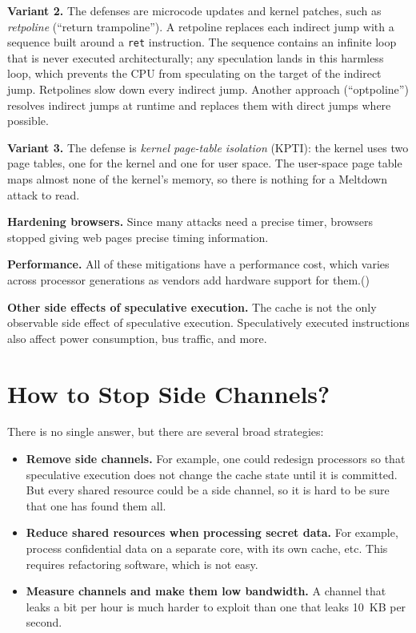 \documentclass[
  letterpaper,
]{scrbook}
\newcounter{none} %
\theoremstyle{definition}
\theoremstyle{plain}
\theoremstyle{plain}
\theoremstyle{remark}
\begin{document}
\textbf{Variant 2.} The defenses are microcode updates and kernel
patches, such as \emph{retpoline} (``return trampoline''). A retpoline
replaces each indirect jump with a sequence built around a \texttt{ret}
instruction. The sequence contains an infinite loop that is never
executed architecturally; any speculation lands in this harmless loop,
which prevents the CPU from speculating on the target of the indirect
jump. Retpolines slow down every indirect jump. Another approach
(``optpoline'') resolves indirect jumps at runtime and replaces them
with direct jumps where possible.

\textbf{Variant 3.} The defense is \emph{kernel page-table isolation}
(KPTI): the kernel uses two page tables, one for the kernel and one for
user space. The user-space page table maps almost none of the kernel's
memory, so there is nothing for a Meltdown attack to read.
{}

\textbf{Hardening browsers.} Since many attacks need a precise timer,
browsers stopped giving web pages precise timing information.

\textbf{Performance.} All of these mitigations have a performance cost,
which varies across processor generations as vendors add hardware
support for them.()

\textbf{Other side effects of speculative execution.} The cache is not
the only observable side effect of speculative execution. Speculatively
executed instructions also affect power consumption, bus traffic, and
more.

\chapter{How to Stop Side Channels?}\label{how-to-stop-side-channels}

There is no single answer, but there are several broad strategies:

\begin{itemize}
\item
  \textbf{Remove side channels.} For example, one could redesign
  processors so that speculative execution does not change the cache
  state until it is committed. But every shared resource could be a side
  channel, so it is hard to be sure that one has found them all.
\item
  \textbf{Reduce shared resources when processing secret data.} For
  example, process confidential data on a separate core, with its own
  cache, etc. This requires refactoring software, which is not easy.
\item
  \textbf{Measure channels and make them low bandwidth.} A channel that
  leaks a bit per hour is much harder to exploit than one that leaks
  10~KB per second.
\end{itemize}
\end{document}
